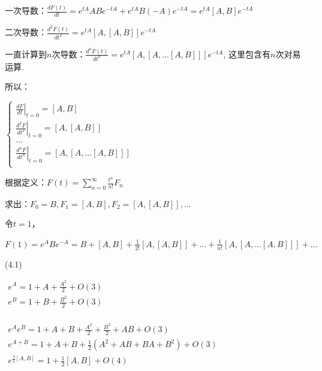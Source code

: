 一次导数：$\frac{{dF\left( t \right)}}{{dt}} = e^{tA} ABe^{ - tA}  + e^{tA} B\left( { - A} \right)e^{ - tA}  = e^{tA} \left[ {A,B} \right]e^{ - tA} $

二次导数：$\frac{{d^2 F\left( t \right)}}{{dt^2 }} = e^{tA} \left[ {A,\left[ {A,B} \right]} \right]e^{ - tA} $

一直计算到$n$次导数：$\frac{{d^n F\left( t \right)}}{{dt^n }} = e^{tA} \left[ {A,\left[ {A,...\left[ {A,B} \right]} \right]} \right]e^{ - tA} $,
这里包含有$n$次对易运算.

所以：

$\left\{ \begin{array}{l}
 \left. {\frac{{dF}}{{dt}}} \right|_{t = 0}  = \left[ {A,B} \right] \\
 \left. {\frac{{d^2 F}}{{dt^2 }}} \right|_{t = 0}  = \left[ {A,\left[ {A,B} \right]} \right] \\
 ... \\
 \left. {\frac{{d^n F}}{{dt^n }}} \right|_{t = 0}  = \left[ {A,\left[ {A,...\left[ {A,B} \right]} \right]} \right] \\
 \end{array} \right.$

根据定义：$F\left( t \right) = \sum\limits_{n = 0}^\infty  {\frac{{t^n }}{{n!}}F_n } $

求出：$F_0  = B,F_1  = \left[ {A,B} \right],F_2  = \left[ {A,\left[ {A,B} \right]} \right],...$

令$t=1$，

$F\left( 1 \right) = e^A Be^{ - A}  = B + \left[ {A,B} \right] + \frac{1}{{2!}}\left[ {A,\left[ {A,B} \right]} \right] + ... + \frac{1}{{n!}}\left[ {A,\left[ {A,...\left[ {A,B} \right]} \right]} \right] + ...$

(4.1)

$\begin{array}{l}
 e^A  = 1 + A + \frac{{A^2 }}{2} + O\left( 3 \right) \\
 e^B  = 1 + B + \frac{{B^2 }}{2} + O\left( 3 \right) \\
 \end{array}$


$\begin{array}{l}
 e^A e^B  = 1 + A + B + \frac{{A^2 }}{2} + \frac{{B^2 }}{2} + AB + O\left( 3 \right) \\
 e^{A + B}  = 1 + A + B + \frac{1}{2}\left( {A^2  + AB + BA + B^2 } \right) + O\left( 3 \right) \\
 e^{\frac{1}{2}\left[ {A,B} \right]}  = 1 + \frac{1}{2}\left[ {A,B} \right] + O\left( 4 \right) \\
 \end{array}$


